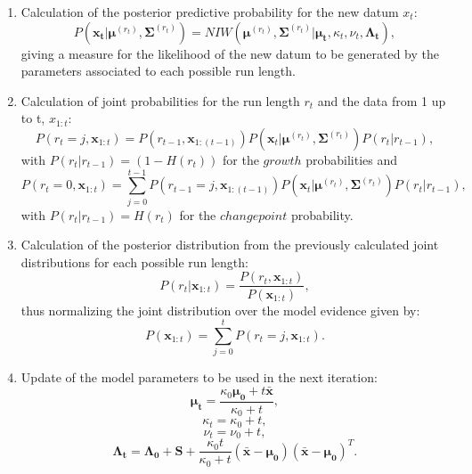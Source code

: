 \documentclass[11pt,twoside,a4paper]{report}
\begin{document}
\begin{enumerate}

\item Calculation of the posterior predictive probability for the new datum $x_t$:
\begin{equation}
P(\boldsymbol{x_t} | \boldsymbol{\mu}^{(r_t)}, \boldsymbol{\Sigma}^{(r_t)}) = NIW(\boldsymbol{\mu}^{(r_t)}, \boldsymbol{\Sigma}^{(r_t)} | \boldsymbol{\mu_t}, \kappa_t, \nu_t, \boldsymbol{\Lambda_t}),
\end{equation}
giving a measure for the likelihood of the new datum to be generated by the parameters associated to each possible run length.

\item Calculation of joint probabilities for the run length $r_t$ and the data from 1 up to t, $x_{1:t}$:
\begin{equation}
P(r_t = j , \boldsymbol{x}_{1:t}) = P(r_{t-1} , \boldsymbol{x}_{1:(t-1)})  P(\boldsymbol{x}_t | \boldsymbol{\mu}^{(r_t)}, \boldsymbol{\Sigma}^{(r_t)})  P(r_t | r_{t - 1}),
\end{equation}
with \( P(r_t | r_{t - 1}) = (1 - H(r_t))\) for the $growth$ probabilities and
\begin{equation}
P(r_t = 0 , \boldsymbol{x}_{1:t}) = \sum_{j=0}^{t-1} P(r_{t-1} = j , \boldsymbol{x}_{1:(t-1)})  P(\boldsymbol{x}_t | \boldsymbol{\mu}^{(r_t)}, \boldsymbol{\Sigma}^{(r_t)})  P(r_t | r_{t - 1}),
\end{equation}
with  \(P(r_t | r_{t - 1}) = H(r_t)\) for the $changepoint$ probability.

\item Calculation of the posterior distribution from the previously calculated joint distributions for each possible run length:
\begin{equation}
P(r_t | \boldsymbol{x}_{1:t}) = \frac{P(r_t , \boldsymbol{x}_{1:t})} {P(\boldsymbol{x}_{1:t})},
\end{equation}
thus normalizing the joint distribution over the model evidence given by:
\begin{equation} \label{eq:multi3}
P(\boldsymbol{x}_{1:t}) = \sum_{j=0}^{t} P(r_t = j , \boldsymbol{x}_{1:t}).
\end{equation}

\item Update of the model parameters to be used in the next iteration:
\begin{equation} \label{eq:multi4}
\boldsymbol{\mu_t} = \frac{\kappa_0\boldsymbol{\mu_0} + t\boldsymbol{\bar{x}}}{\kappa_0 + t}, 
\end{equation}
\begin{equation}
\kappa_t = \kappa_0 + t,
\end{equation}
\begin{equation}
\nu_t = \nu_0 + t,
\end{equation}
\begin{equation} \label{eq:multi4end}
\boldsymbol{\Lambda_t} = \boldsymbol{\Lambda_0} + \boldsymbol{S} + \frac{\kappa_0t}{\kappa_0 + t}(\boldsymbol{\bar{x}} - \boldsymbol{\mu_0})(\boldsymbol{\bar{x}} - \boldsymbol{\mu_0})^T. 
\end{equation}

\end{enumerate}
\end{document}
